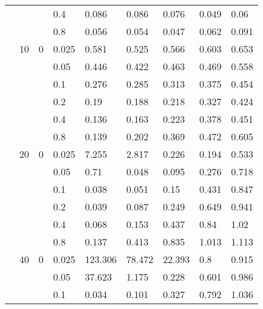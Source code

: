 \begin{longtable}{|l|l|l|l|l|l|l|l|l|}
\cmidrule{4-9} &     &          & 0.4            & 0.086      & 0.086      & 0.076      & 0.049      & 0.06       \\
\cmidrule{4-9} &     &          & 0.8            & 0.056      & 0.054      & 0.047      & 0.062      & 0.091      \\
\cmidrule{2-9} & 10  & 0        & 0.025          & 0.581      & 0.525      & 0.566      & 0.603      & 0.653      \\
\cmidrule{4-9} &     &          & 0.05           & 0.446      & 0.422      & 0.463      & 0.469      & 0.558      \\
\cmidrule{4-9} &     &          & 0.1            & 0.276      & 0.285      & 0.313      & 0.375      & 0.454      \\
\cmidrule{4-9} &     &          & 0.2            & 0.19       & 0.188      & 0.218      & 0.327      & 0.424      \\
\cmidrule{4-9} &     &          & 0.4            & 0.136      & 0.163      & 0.223      & 0.378      & 0.451      \\
\cmidrule{4-9} &     &          & 0.8            & 0.139      & 0.202      & 0.369      & 0.472      & 0.605      \\
\cmidrule{2-9} & 20  & 0        & 0.025          & 7.255      & 2.817      & 0.226      & 0.194      & 0.533      \\
\cmidrule{4-9} &     &          & 0.05           & 0.71       & 0.048      & 0.095      & 0.276      & 0.718      \\
\cmidrule{4-9} &     &          & 0.1            & 0.038      & 0.051      & 0.15       & 0.431      & 0.847      \\
\cmidrule{4-9} &     &          & 0.2            & 0.039      & 0.087      & 0.249      & 0.649      & 0.941      \\
\cmidrule{4-9} &     &          & 0.4            & 0.068      & 0.153      & 0.437      & 0.84       & 1.02       \\
\cmidrule{4-9} &     &          & 0.8            & 0.137      & 0.413      & 0.835      & 1.013      & 1.113      \\
\cmidrule{2-9} & 40  & 0        & 0.025          & 123.306    & 78.472     & 22.393     & 0.8        & 0.915      \\
\cmidrule{4-9} &     &          & 0.05           & 37.623     & 1.175      & 0.228      & 0.601      & 0.986      \\
\cmidrule{4-9} &     &          & 0.1            & 0.034      & 0.101      & 0.327      & 0.792      & 1.036      \\

\end{longtable}
